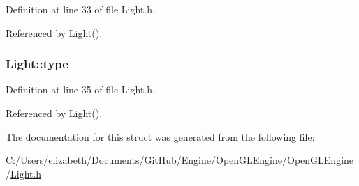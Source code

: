 Definition at line 33 of file Light.\+h.



Referenced by Light().

\subsubsection[{\texorpdfstring{type}{type}}]{ Light\+::type\hspace{0.3cm}{\ttfamily [protected]}}\hypertarget{struct_light_a86e648b4a80a5c1e194c97ef52f9efc6}{}\label{struct_light_a86e648b4a80a5c1e194c97ef52f9efc6}


Definition at line 35 of file Light.\+h.



Referenced by Light().



The documentation for this struct was generated from the following file\+:\begin{DoxyCompactItemize}
\item 
C\+:/\+Users/elizabeth/\+Documents/\+Git\+Hub/\+Engine/\+Open\+G\+L\+Engine/\+Open\+G\+L\+Engine/\hyperlink{_light_8h}{Light.\+h}\end{DoxyCompactItemize}
